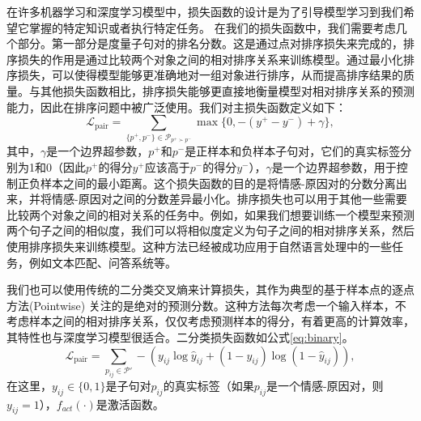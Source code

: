     
\label{sec:loss}


在许多机器学习和深度学习模型中，损失函数的设计是为了引导模型学习到我们希望它掌握的特定知识或者执行特定任务。
在我们的损失函数中，我们需要考虑几个部分。第一部分是度量子句对的排名分数。这是通过点对排序损失来完成的，排序损失的作用是通过比较两个对象之间的相对排序关系来训练模型。通过最小化排序损失，可以使得模型能够更准确地对一组对象进行排序，从而提高排序结果的质量。与其他损失函数相比，排序损失能够更直接地衡量模型对相对排序关系的预测能力，因此在排序问题中被广泛使用。我们对主损失函数定义如下：
\vspace{3pt}  \begin{equation}
\mathcal{L}_{\mathrm{pair}}=\sum_{\{p^{+},p^{-}\}\in\mathcal{P}_{p^{+} \succ p^{-}} }\operatorname*{max}\{0,-(y^{+}-y^{-})+\gamma \} ,
\end{equation} \vspace{4pt}
其中，$\gamma$是一个边界超参数，$p^+$和$p^-$是正样本和负样本子句对，它们的真实标签分别为1和0（因此$p^+$的得分$y^+$应该高于$p^-$的得分$y^-$），$\gamma$是一个边界超参数，用于控制正负样本之间的最小距离。这个损失函数的目的是将情感-原因对的分数分离出来，并将情感-原因对之间的分数差异最小化。排序损失也可以用于其他一些需要比较两个对象之间的相对关系的任务中。例如，如果我们想要训练一个模型来预测两个句子之间的相似度，我们可以将相似度定义为句子之间的相对排序关系，然后使用排序损失来训练模型。这种方法已经被成功应用于自然语言处理中的一些任务，例如文本匹配、问答系统等。

我们也可以使用传统的二分类交叉熵来计算损失，其作为典型的基于样本点的逐点方法(Pointwise) 关注的是绝对的预测分数。这种方法每次考虑一个输入样本，不考虑样本之间的相对排序关系，仅仅考虑预测样本的得分，有着更高的计算效率，其特性也与深度学习模型很适合。二分类损失函数如公式\ref{eq:binary}。
\vspace{3pt}  \begin{equation}
\label{eq:binary}
\mathcal{L}_{\mathrm{pair}}=\sum\limits_{p_{ij}\in\mathcal{P}'}-(y_{ij}\log\hat{y}_{ij}+(1-y_{ij})\log(1-\hat{y}_{ij})),
\end{equation} \vspace{4pt}
在这里，$y_{ij}\in\{0,1\}$是子句对$p_{ij}$的真实标签（如果$p_{ij}$是一个情感-原因对，则$y_{ij}=1$），$f_{act}(\cdot)$是激活函数。

